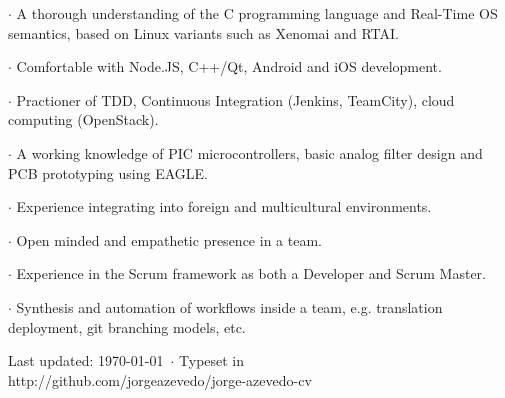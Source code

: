 {
 $\cdot$ A thorough understanding of the C programming language and Real-Time OS
semantics, based on Linux variants such as Xenomai and RTAI.

 $\cdot$ Comfortable with Node.JS, C++/Qt, Android and iOS development.

 $\cdot$ Practioner of TDD, Continuous Integration (Jenkins, TeamCity), cloud
computing (OpenStack).
}
{
 $\cdot$ A working knowledge of PIC microcontrollers, basic analog filter design and PCB
prototyping using EAGLE.
}
{
 $\cdot$ Experience integrating into foreign and multicultural environments.

 $\cdot$ Open minded and empathetic presence in a team.
}
{

 $\cdot$ Experience in the Scrum framework as both a Developer and Scrum
Master.

 $\cdot$ Synthesis and automation of workflows inside a team, e.g.
translation deployment, git branching models, etc.
}


\vfill

\begin{center}
{
    \scriptsize  Last updated: \today ~$\cdot$ Typeset in \XeLaTeX\\
    http://github.com/jorgeazevedo/jorge-azevedo-cv
}

\end{center}

